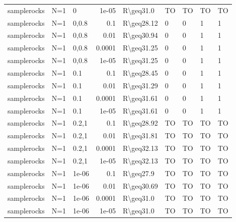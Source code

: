 \begin{longtable}{lllrlllll}
 samplerocks   & N=1       & 0     & 1e-05  & R\textbackslash{}geq31.0  & TO   & TO   & TO       & TO      \\
 samplerocks   & N=1       & 0,0.8 & 0.1    & R\textbackslash{}geq28.12 & 0    & 0    & 1        & 1       \\
 samplerocks   & N=1       & 0,0.8 & 0.01   & R\textbackslash{}geq30.94 & 0    & 0    & 1        & 1       \\
 samplerocks   & N=1       & 0,0.8 & 0.0001 & R\textbackslash{}geq31.25 & 0    & 0    & 1        & 1       \\
 samplerocks   & N=1       & 0,0.8 & 1e-05  & R\textbackslash{}geq31.25 & 0    & 0    & 1        & 1       \\
 samplerocks   & N=1       & 0.1   & 0.1    & R\textbackslash{}geq28.45 & 0    & 0    & 1        & 1       \\
 samplerocks   & N=1       & 0.1   & 0.01   & R\textbackslash{}geq31.29 & 0    & 0    & 1        & 1       \\
 samplerocks   & N=1       & 0.1   & 0.0001 & R\textbackslash{}geq31.61 & 0    & 0    & 1        & 1       \\
 samplerocks   & N=1       & 0.1   & 1e-05  & R\textbackslash{}geq31.61 & 0    & 0    & 1        & 1       \\
 samplerocks   & N=1       & 0.2,1 & 0.1    & R\textbackslash{}geq28.92 & TO   & TO   & TO       & TO      \\
 samplerocks   & N=1       & 0.2,1 & 0.01   & R\textbackslash{}geq31.81 & TO   & TO   & TO       & TO      \\
 samplerocks   & N=1       & 0.2,1 & 0.0001 & R\textbackslash{}geq32.13 & TO   & TO   & TO       & TO      \\
 samplerocks   & N=1       & 0.2,1 & 1e-05  & R\textbackslash{}geq32.13 & TO   & TO   & TO       & TO      \\
 samplerocks   & N=1       & 1e-06 & 0.1    & R\textbackslash{}geq27.9  & TO   & TO   & TO       & TO      \\
 samplerocks   & N=1       & 1e-06 & 0.01   & R\textbackslash{}geq30.69 & TO   & TO   & TO       & TO      \\
 samplerocks   & N=1       & 1e-06 & 0.0001 & R\textbackslash{}geq31.0  & TO   & TO   & TO       & TO      \\
 samplerocks   & N=1       & 1e-06 & 1e-05  & R\textbackslash{}geq31.0  & TO   & TO   & TO       & TO      \\
\bottomrule
\end{longtable}
